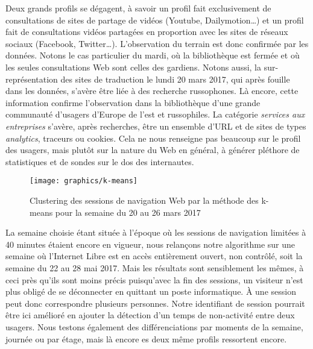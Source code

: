 \documentclass[symmetric,justified,marginals=raggedouter]{tufte-book}
\begin{document}
Deux grands profils se dégagent, à savoir un profil fait exclusivement de consultations de sites de partage de vidéos (Youtube, Dailymotion\ldots{}) et un profil fait de consultations vidéos partagées en proportion avec les sites de réseaux sociaux (Facebook, Twitter\ldots{}). L'observation du terrain est donc confirmée par les données. Notons le cas particulier du mardi, où la bibliothèque est fermée et où les seules consultations Web sont celles des gardiens. Notons aussi, la sur-représentation des sites de traduction le lundi 20 mars 2017, qui après fouille dans les données, s'avère être liée à des recherche russophones. Là encore, cette information confirme l'observation dans la bibliothèque d'une grande communauté d'usagers d'Europe de l'est et russophiles. La catégorie \textit{services aux entreprises} s'avère, après recherches, être un ensemble d'URL et de sites de types \textit{analytics}, traceurs ou cookies. Cela ne nous renseigne pas beaucoup sur le profil des usagers, mais plutôt sur la nature du Web en général, à générer pléthore de statistiques et de sondes sur le dos des internautes.

\begin{figure*}
  \texttt{[image: graphics/k-means]}
  \caption{Clustering des sessions de navigation Web par la méthode des k-means pour la semaine du 20 au 26 mars 2017}
  \label{fig:k-means}
\end{figure*}

\noindent La semaine choisie étant située à l'époque où les sessions de navigation limitées à 40 minutes étaient encore en vigueur, nous relançons notre algorithme sur une semaine où l'Internet Libre est en accès entièrement ouvert, non contrôlé, soit la semaine du 22 au 28 mai 2017. Mais les résultats sont sensiblement les mêmes, à ceci près qu'ils sont moins précis puisqu'avec la fin des sessions, un visiteur n'est plus obligé de se déconnecter en quittant un poste informatique. À une session peut donc correspondre plusieurs personnes. Notre identifiant de session pourrait être ici amélioré en ajouter la détection d'un temps de non-activité entre deux usagers. Nous testons également des différenciations par moments de la semaine, journée ou par étage, mais là encore es deux même profils ressortent encore.
\end{document}
